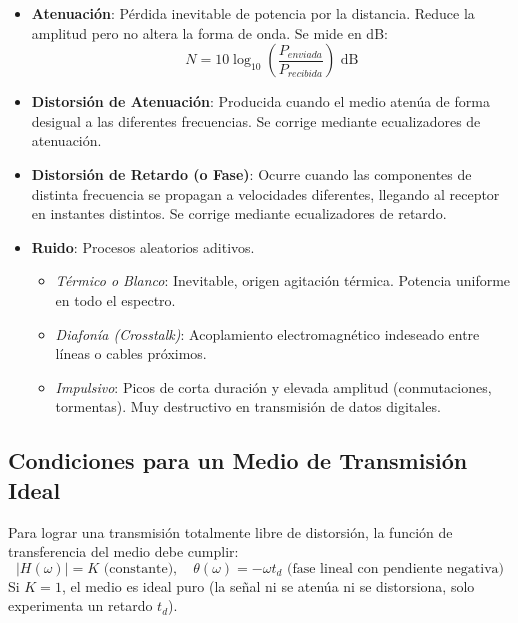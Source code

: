 \begin{tcolorbox}[cajaResumen, title={Tipos de Perturbaciones}]
\begin{itemize}[leftmargin=*]
    \item \textbf{Atenuación}: Pérdida inevitable de potencia por la distancia. Reduce la amplitud pero no altera la forma de onda. Se mide en dB:
    \begin{equation}
        N = 10 \log_{10}\left(\frac{P_{enviada}}{P_{recibida}}\right) \text{ dB}
    \end{equation}
    \item \textbf{Distorsión de Atenuación}: Producida cuando el medio atenúa de forma desigual a las diferentes frecuencias. Se corrige mediante ecualizadores de atenuación.
    \item \textbf{Distorsión de Retardo (o Fase)}: Ocurre cuando las componentes de distinta frecuencia se propagan a velocidades diferentes, llegando al receptor en instantes distintos. Se corrige mediante ecualizadores de retardo.
    \item \textbf{Ruido}: Procesos aleatorios aditivos.
    \begin{itemize}
        \item \textit{Térmico o Blanco}: Inevitable, origen agitación térmica. Potencia uniforme en todo el espectro.
        \item \textit{Diafonía (Crosstalk)}: Acoplamiento electromagnético indeseado entre líneas o cables próximos.
        \item \textit{Impulsivo}: Picos de corta duración y elevada amplitud (conmutaciones, tormentas). Muy destructivo en transmisión de datos digitales.
    \end{itemize}
\end{itemize}
\end{tcolorbox}

\subsection{Condiciones para un Medio de Transmisión Ideal}
Para lograr una transmisión totalmente libre de distorsión, la función de transferencia del medio debe cumplir:
\begin{equation}
    |H(\omega)| = K \text{ (constante)}, \quad \theta(\omega) = -\omega t_d \text{ (fase lineal con pendiente negativa)}
\end{equation}
Si $K = 1$, el medio es ideal puro (la señal ni se atenúa ni se distorsiona, solo experimenta un retardo $t_d$).

